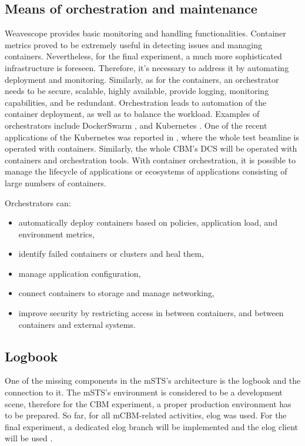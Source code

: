 \subsection{Means of orchestration and maintenance} 
Weavescope provides basic monitoring and handling functionalities. Container metrics proved to be extremely useful in detecting issues and managing containers. Nevertheless, for the final experiment, a much more sophisticated infrastructure is foreseen. Therefore, it's necessary to address it by automating deployment and monitoring. Similarly, as for the containers, an orchestrator needs to be secure, scalable, highly available, provide logging, monitoring capabilities, and be redundant. Orchestration leads to automation of the container deployment, as well as to balance the workload. 
Examples of orchestrators include DockerSwarm \cite{DockerSwarm}, and Kubernetes \cite{Kubernetes}. One of the recent applications of the Kubernetes was reported in \cite{ICALEPCS2021:Diamond}, where the whole test beamline is operated with containers. Similarly, the whole CBM's DCS will be operated with containers and orchestration tools. 
With container orchestration, it is possible to manage the lifecycle of applications or ecosystems of applications consisting of large numbers of containers. 

Orchestrators can:
 \begin{itemize}
     \item automatically deploy containers based on policies, application load, and environment metrics,
     \item identify failed containers or clusters and heal them,
     \item manage application configuration,
     \item connect containers to storage and manage networking,
     \item improve security by restricting access in between containers, and between containers and external systems.
 \end{itemize}
\subsection{Logbook}
One of the missing components in the mSTS's architecture is the logbook and the connection to it. The mSTS's environment is considered to be a development scene, therefore for the CBM experiment, a proper production environment has to be prepared. So far, for all mCBM-related activities, elog \cite{elog} was used. For the final experiment, a dedicated elog branch will be implemented and the elog client will be used \cite{elog_client}.

